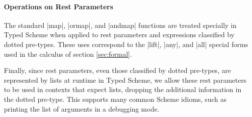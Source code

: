 \begin{schemeregion}
\paragraph{Operations on Rest Parameters}


The standard \scheme|map|, \scheme|ormap|, and
\scheme|andmap| functions are treated specially in Typed Scheme when
applied to rest parameters and expressions classified by dotted
pre-types.  These uses correspond to the \scheme|lift|, \scheme|any|,
and \scheme|all| special forms used in the calculus of section
\ref{sec:formal}.

Finally, since rest parameters, even those classified by dotted pre-types, are
represented by lists at runtime in Typed Scheme, we allow these rest
parameters to be used in contexts that expect lists, dropping the
additional information in the dotted pre-type.  This supports many common Scheme
idioms, such as printing the list of arguments in a debugging mode.  



\end{schemeregion}
